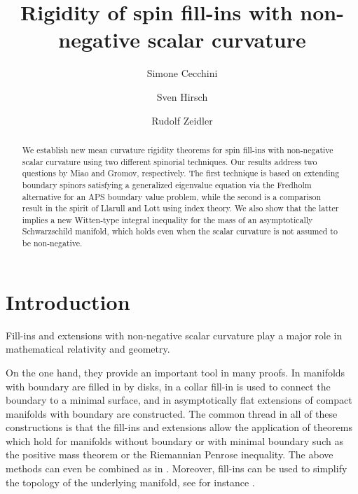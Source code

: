 \documentclass[a4paper,11pt]{amsart}
\title[Rigidity of spin NNSC fill-ins]{Rigidity of spin fill-ins with non-negative scalar curvature} %
\author{Simone Cecchini}
\author{Sven Hirsch}
\author{Rudolf Zeidler}
\numberwithin{equation}{section}
\begin{document}
\begin{abstract}
We establish new mean curvature rigidity theorems for spin fill-ins with non-negative scalar curvature using two different spinorial techniques.
Our results address two questions by Miao and Gromov, respectively.
The first technique is based on extending boundary spinors satisfying a generalized eigenvalue equation via the Fredholm alternative for an APS boundary value problem, while the second is a comparison result in the spirit of Llarull and Lott using index theory.
We also show that the latter implies a new Witten-type integral inequality for the mass of an asymptotically Schwarzschild manifold, which holds even when the scalar curvature is not assumed to be non-negative.
\end{abstract}
\maketitle








\section{Introduction}





Fill-ins and extensions with non-negative scalar curvature play a major role in mathematical relativity and geometry.

On the one hand, they provide an important tool in many proofs.
In \cite{bray2001proof, bunting1987nonexistence, cederbaum2017uniqueness, hirsch2020positive} manifolds with boundary are filled in by disks, in \cite{mccormick2019penrose} a collar fill-in is used to connect the boundary to a minimal surface, and in \cite{shi-tam-manifolds-with-boundary,wang2009isometric} asymptotically flat extensions of compact manifolds with boundary are constructed.
The common thread in all of these constructions is that the fill-ins and extensions allow the application of theorems which hold for manifolds without boundary or with minimal boundary such as the positive mass theorem or the Riemannian Penrose inequality.
The above methods can even be combined as in \cite{cederbaum2017uniqueness, mantoulidis2015bartnik}.
Moreover, fill-ins can be used to simplify the topology of the underlying manifold, see for instance \cite{agostiniani2023new, bray2022harmonic}.
\end{document}
